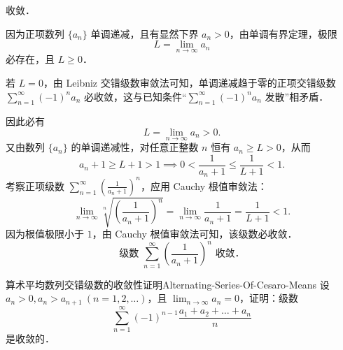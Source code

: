 \begin{solution}
    收敛．

    因为正项数列 $\{a_n\}$ 单调递减，且有显然下界 $a_n > 0$，由单调有界定理，极限
    \begin{equation}
        L = \lim_{n\to\infty} a_n
    \end{equation}
    必存在，且 $L \geqslant 0$．

    若 $L = 0$，由 Leibniz 交错级数审敛法可知，单调递减趋于零的正项交错级数 $\sum_{n=1}^\infty (-1)^n a_n$ 必收敛，这与已知条件“$\sum_{n=1}^\infty (-1)^n a_n$ 发散”相矛盾．

    因此必有
    \begin{equation}
        L = \lim_{n\to\infty} a_n > 0.
    \end{equation}
    又由数列 $\{a_n\}$ 的单调递减性，对任意正整数 $n$ 恒有 $a_n \geqslant L > 0$，从而
    \begin{equation}
        a_n + 1 \geqslant L + 1 > 1 \implies 0 < \frac{1}{a_n + 1} \leqslant \frac{1}{L + 1} < 1.
    \end{equation}
    考察正项级数 $\sum_{n=1}^\infty \left(\frac{1}{a_n + 1}\right)^n$，应用 Cauchy 根值审敛法：
    \begin{equation}
        \lim_{n\to\infty} \sqrt[n]{\left(\frac{1}{a_n + 1}\right)^n} = \lim_{n\to\infty} \frac{1}{a_n + 1} = \frac{1}{L + 1} < 1.
    \end{equation}
    因为根值极限小于 $1$，由 Cauchy 根值审敛法可知，该级数必收敛．
    \begin{equation}
        \boxed{\text{级数 } \sum_{n=1}^\infty \left(\frac{1}{a_n + 1}\right)^n \text{ 收敛．}}
    \end{equation}
\end{solution}

\begin{problem}{算术平均数列交错级数的收敛性证明}{Alternating-Series-Of-Cesaro-Means}
    设 $a_n > 0, a_n > a_{n+1} \ (n = 1, 2, \dots)$，且 $\lim_{n\to\infty} a_n = 0$，证明：级数
    \begin{equation}
        \sum_{n=1}^\infty (-1)^{n-1}\frac{a_1 + a_2 + \dots + a_n}{n}
    \end{equation}
    是收敛的．
\end{problem}

